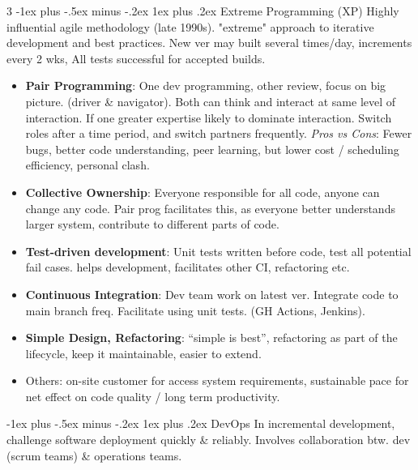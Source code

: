 \documentclass[a4paper, 10pt, landscape]{article}
\makeatletter
\renewcommand{\subsubsection}{\@startsection{subsubsection}{3}{0mm}%
                                {-1ex plus -.5ex minus -.2ex}%
                                {1ex plus .2ex}%
                                {\normalfont\small\bfseries}}
\makeatother
\begin{document}
\begin{multicols*}{3}
\subsubsection{Extreme Programming (XP)}
Highly influential agile methodology (late 1990s). "extreme" approach to iterative development and best practices. New ver may built several times/day, increments every 2 wks, All tests successful for accepted builds.
\begin{itemize}
\item \textbf{Pair Programming}:  One dev programming, other review, focus on big picture. (driver \& navigator). Both can think and interact at same level of 
interaction. If one greater expertise likely to dominate interaction. Switch roles after a time period, and switch partners frequently. \textit{Pros vs Cons}: Fewer bugs, better code understanding, peer learning, but lower cost / scheduling efficiency, personal clash.
\item \textbf{Collective Ownership}:  Everyone responsible for all code, anyone can change any code. Pair prog facilitates this, as everyone better 
understands larger system, contribute to different parts of code.
\item \textbf{Test-driven development}: Unit tests written before code, test all potential fail cases. helps development, facilitates other CI, refactoring etc.
\item \textbf{Continuous Integration}: Dev team work on latest ver. Integrate code to main branch freq. Facilitate using unit tests. (GH Actions, Jenkins).
\item \textbf{Simple Design, Refactoring}: “simple is best”, refactoring as part of the lifecycle, keep it maintainable, easier to extend.
\item Others: on-site customer for access system requirements, sustainable pace for net effect on code quality / long term productivity.
\end{itemize}

\subsubsection{DevOps}
In incremental development, challenge software deployment quickly \& reliably. Involves collaboration btw. dev (scrum teams) \& operations teams.


\end{multicols*}
\end{document}
